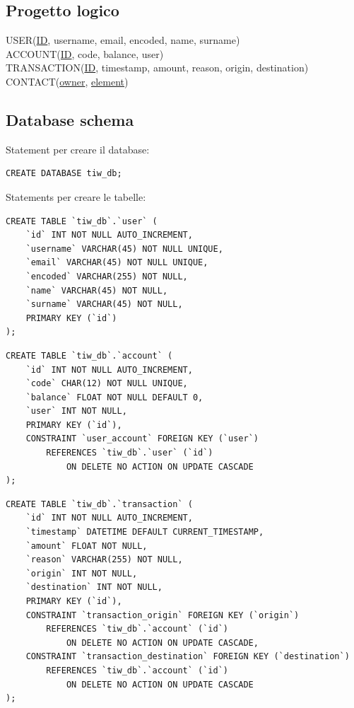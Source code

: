 \documentclass{article}
\begin{document}
\subsection{Progetto logico}
USER(\underline{ID}, username, email, encoded, name, surname)
\\
ACCOUNT(\underline{ID}, code, balance, user)
\\
TRANSACTION(\underline{ID}, timestamp, amount, reason, origin, destination)
\\
CONTACT(\underline{owner}, \underline{element})

\subsection{Database schema}
Statement per creare il database:
\begin{verbatim}
CREATE DATABASE tiw_db;
\end{verbatim}

\pagebreak
Statements per creare le tabelle: 
\begin{verbatim}
CREATE TABLE `tiw_db`.`user` (
	`id` INT NOT NULL AUTO_INCREMENT,
	`username` VARCHAR(45) NOT NULL UNIQUE,
	`email` VARCHAR(45) NOT NULL UNIQUE,
	`encoded` VARCHAR(255) NOT NULL,
	`name` VARCHAR(45) NOT NULL,
	`surname` VARCHAR(45) NOT NULL,
	PRIMARY KEY (`id`)
);
\end{verbatim}

\begin{verbatim}
CREATE TABLE `tiw_db`.`account` (
	`id` INT NOT NULL AUTO_INCREMENT,
	`code` CHAR(12) NOT NULL UNIQUE,
	`balance` FLOAT NOT NULL DEFAULT 0,
	`user` INT NOT NULL,
	PRIMARY KEY (`id`),
	CONSTRAINT `user_account` FOREIGN KEY (`user`) 
		REFERENCES `tiw_db`.`user` (`id`) 
			ON DELETE NO ACTION ON UPDATE CASCADE
);
\end{verbatim}

\begin{verbatim}
CREATE TABLE `tiw_db`.`transaction` (
	`id` INT NOT NULL AUTO_INCREMENT,
	`timestamp` DATETIME DEFAULT CURRENT_TIMESTAMP,
	`amount` FLOAT NOT NULL,
	`reason` VARCHAR(255) NOT NULL,
	`origin` INT NOT NULL,
	`destination` INT NOT NULL,
	PRIMARY KEY (`id`),
	CONSTRAINT `transaction_origin` FOREIGN KEY (`origin`) 
		REFERENCES `tiw_db`.`account` (`id`)
			ON DELETE NO ACTION ON UPDATE CASCADE,
	CONSTRAINT `transaction_destination` FOREIGN KEY (`destination`) 
		REFERENCES `tiw_db`.`account` (`id`) 
			ON DELETE NO ACTION ON UPDATE CASCADE
);
\end{verbatim}
\pagebreak
\end{document}
